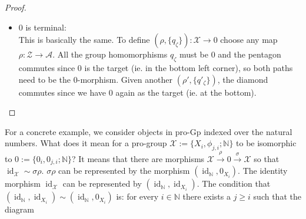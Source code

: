 \documentclass[a4paper,11pt]{article}
\theoremstyle{definition}
\theoremstyle{plain}
\theoremstyle{remark}
\DeclareMathOperator{\id}{id}
\begin{document}
{\begin{proof}
\begin{itemize}
 obviously commutes since both paths are $0$. This shows that there is a morphism $0\rightarrow \mathcal{Y}$. To show uniqueness, let $\rho': \mathcal{B}\rightarrow \mathcal{Z}$ be another map. Again the group homomorphisms $q'_{\beta}:0_{\rho'(\beta)}\rightarrow Y_{\beta}$ have to be the $0$-morphism. We now check that $(\rho,\{q_{\beta}\})\sim (\rho',\{q'_{\beta}\})$. Let $\beta\in \mathcal{B}$ and choose a $\zeta\in \mathcal{Z}$ with $\zeta\geq \rho(\beta), \rho'(\beta)$. Then the diagram
 
 

\begin{figure}[H]
\center
{}
 \end{figure}

commutes because both paths are $0$. 


\item $0$ is terminal:\\

This is basically the same. To define $(\rho,\{q_{\zeta}\}): \mathcal{X}\rightarrow 0$ choose any map $\rho: \mathcal{Z}\rightarrow \mathcal{A}$. All the group homomorphisms $q_{\zeta}$ must be $0$ and the pentagon commutes since $0$ is the target (ie. in the bottom left corner), so both paths need to be the $0$-morphism. Given another $(\rho',\{q'_{\zeta}\})$, the diamond commutes since we have $0$ again as the target (ie. at the bottom).
\end{itemize}
\end{proof}

For a concrete example, we consider objects in pro-Gp indexed over the natural numbers. What does it mean for a pro-group $\mathcal{X}:=\{X_{i},\phi_{j,i};\mathbb{N}\}$ to be isomorphic to $0:=\{0_{i}, 0_{j,i};\mathbb{N}\}$? It means that there are morphisms $\mathcal{X}\xrightarrow{\rho} 0 \xrightarrow{\sigma} \mathcal{X}$ so that $\id_{\mathcal{X}} \sim \sigma\rho$. $\sigma \rho$ can be represented by the morphism $(\id_{\mathbb{N}},0_{X_{i}})$. The identity morphism $\id_{\mathcal{X}}$ can be represented by $(\id_{\mathbb{N}},\id_{X_{i}})$. The condition that $(\id_{\mathbb{N}},\id_{X_{i}}) \sim (\id_{\mathbb{N}},0_{X_{i}})$ is: for every $i\in \mathbb{N}$ there exists a $j\geq i$ such that the diagram


}
\end{document}
